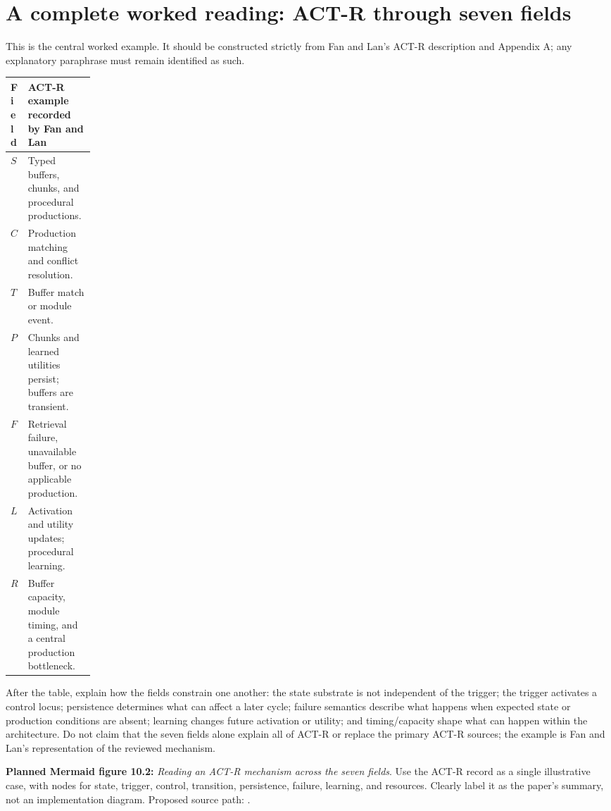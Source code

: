 \section{A complete worked reading: ACT-R through seven fields}
This is the central worked example. It should be constructed strictly from Fan and Lan's ACT-R description and Appendix A; any explanatory paraphrase must remain identified as such.
\begin{center}
\small
\begin{tabularx}{\linewidth}{>{\bfseries}p{0.14\linewidth} X}
\toprule
Field & ACT-R example recorded by Fan and Lan \\
\midrule
$S$ & Typed buffers, chunks, and procedural productions. \\
$C$ & Production matching and conflict resolution. \\
$T$ & Buffer match or module event. \\
$P$ & Chunks and learned utilities persist; buffers are transient. \\
$F$ & Retrieval failure, unavailable buffer, or no applicable production. \\
$L$ & Activation and utility updates; procedural learning. \\
$R$ & Buffer capacity, module timing, and a central production bottleneck. \\
\bottomrule
\end{tabularx}
\end{center}
After the table, explain how the fields constrain one another: the state substrate is not independent of the trigger; the trigger activates a control locus; persistence determines what can affect a later cycle; failure semantics describe what happens when expected state or production conditions are absent; learning changes future activation or utility; and timing/capacity shape what can happen within the architecture. Do not claim that the seven fields alone explain all of ACT-R or replace the primary ACT-R sources; the example is Fan and Lan's representation of the reviewed mechanism.

\textbf{Planned Mermaid figure 10.2:} \emph{Reading an ACT-R mechanism across the seven fields}. Use the ACT-R record as a single illustrative case, with nodes for state, trigger, control, transition, persistence, failure, learning, and resources. Clearly label it as the paper's summary, not an implementation diagram. Proposed source path: .

